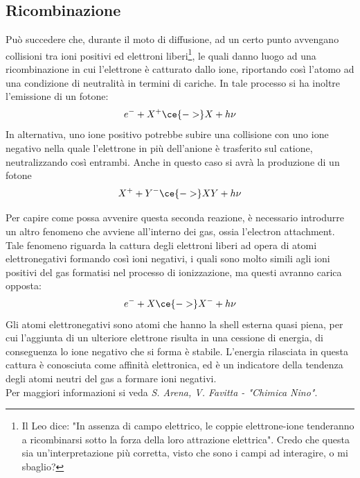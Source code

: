 \subsection{Ricombinazione}
Può succedere che, durante il moto di diffusione, ad un certo punto avvengano collisioni tra ioni positivi ed elettroni liberi\footnote{Il Leo dice: "In assenza di campo elettrico, le coppie elettrone-ione tenderanno a ricombinarsi sotto la forza della loro attrazione elettrica". Credo che questa sia un'interpretazione più corretta, visto che sono i campi ad interagire, o mi sbaglio?}, le quali danno luogo ad una ricombinazione in cui l'elettrone è catturato dallo ione, riportando così l'atomo ad una condizione di neutralità in termini di cariche. In tale processo si ha inoltre l'emissione di un fotone:
\begin{equation*}
   e^- + X^+ \ce{->} X + h\nu
\end{equation*}
In alternativa, uno ione positivo potrebbe subire una collisione con uno ione negativo nella quale l'elettrone in più dell'anione è trasferito sul catione, neutralizzando così entrambi. Anche in questo caso si avrà la produzione di un fotone
\begin{equation*}
   X^+ + Y^- \ce{->} XY + h\nu
\end{equation*}

\begin{approfondimento}
   \footnotesize Per capire come possa avvenire questa seconda reazione, è necessario introdurre un altro fenomeno che avviene all'interno dei gas, ossia l'electron attachment.\\
   Tale fenomeno riguarda la cattura degli elettroni liberi ad opera di atomi elettronegativi formando così ioni negativi, i quali sono molto simili agli ioni positivi del gas formatisi nel processo di ionizzazione, ma questi avranno carica opposta:
   \begin{equation*}
      e^- + X \ce{->} X^- + h\nu
   \end{equation*}
   Gli atomi elettronegativi sono atomi che hanno la shell esterna quasi piena, per cui l'aggiunta di un ulteriore elettrone risulta in una cessione di energia, di conseguenza lo ione negativo che si forma è stabile. L'energia rilasciata in questa cattura è conosciuta come affinità elettronica, ed è un indicatore della tendenza degli atomi neutri del gas a formare ioni negativi.%
   \\Per maggiori informazioni si veda \textit{S. Arena, V. Favitta - "Chimica Nino"}.
\end{approfondimento}

